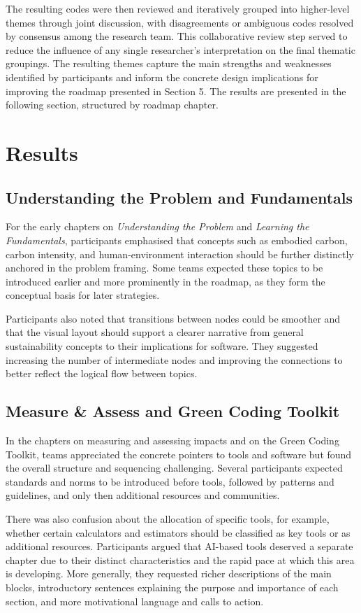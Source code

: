 \documentclass[english]{lni}
\begin{document}
The resulting codes were then reviewed and iteratively grouped into higher-level themes through joint discussion, with disagreements or ambiguous codes resolved by consensus among the research team. This collaborative review step served to reduce the influence of any single researcher's interpretation on the final thematic groupings. The resulting themes capture the main strengths and weaknesses identified by participants and inform the concrete design implications for improving the roadmap presented in Section 5. The results are presented in the following section, structured by roadmap chapter.

\section{Results}
\subsection{Understanding the Problem and Fundamentals}
For the early chapters on \emph{Understanding the Problem} and \emph{Learning the Fundamentals}, participants emphasised that concepts such as embodied carbon, carbon intensity, and human-environment interaction should be further distinctly anchored in the problem framing. Some teams expected these topics to be introduced earlier and more prominently in the roadmap, as they form the conceptual basis for later strategies.

Participants also noted that transitions between nodes could be smoother and that the visual layout should support a clearer narrative from general sustainability concepts to their implications for software. They suggested increasing the number of intermediate nodes and improving the connections to better reflect the logical flow between topics.


\subsection{Measure \& Assess and Green Coding Toolkit}
In the chapters on measuring and assessing impacts and on the Green Coding Toolkit, teams appreciated the concrete pointers to tools and software but found the overall structure and sequencing challenging. Several participants expected standards and norms to be introduced before tools, followed by patterns and guidelines, and only then additional resources and communities.

There was also confusion about the allocation of specific tools, for example, whether certain calculators and estimators should be classified as key tools or as additional resources. Participants argued that AI-based tools deserved a separate chapter due to their distinct characteristics and the rapid pace at which this area is developing. More generally, they requested richer descriptions of the main blocks, introductory sentences explaining the purpose and importance of each section, and more motivational language and calls to action.
\end{document}
